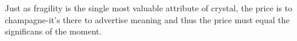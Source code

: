 
Just as fragility is the single most valuable attribute of crystal, the price is to champagne-it's there to advertise meaning and thus the price must equal the significans of the moment.


